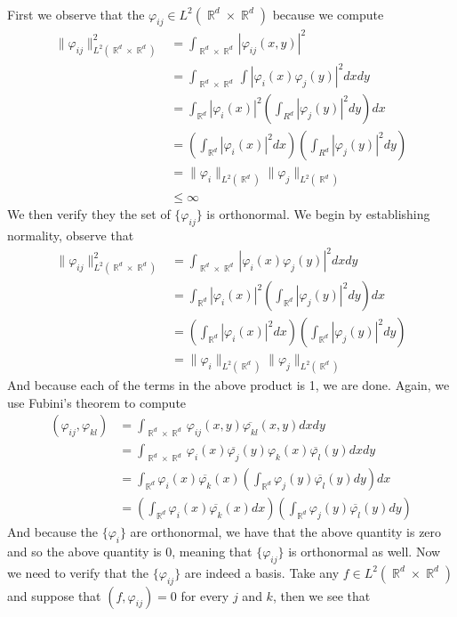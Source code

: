\documentclass{article}
\DeclareMathOperator{\R}{\mathbb{R}}
\newcommand{\problem}[1]{\noindent{\textbf{Problem #1}}\\}
\newcommand{\norm}[1]{\|#1\|}
\begin{document}
\problem{4.7.7} First we observe that the $\varphi_{ij} \in L^2(\R^d \times \R^d)$ because we compute
\begin{align*}
\norm{\varphi_{ij}}^2_{L^2(\R^d \times \R^d)} &=\int_{\R^d \times \R^d} |\varphi_{ij}(x,y)|^2 \\
&= \int_{\R^d \times \R^d}\int |\varphi_i(x)\varphi_j(y)|^2dxdy \\
&= \int_{\R^d} |\varphi_i(x)|^2\left(\int_{R^d} |\varphi_j(y)|^2dy\right)dx \\
&= \left(\int_{\R^d} |\varphi_i(x)|^2dx\right)\left(\int_{R^d} |\varphi_j(y)|^2dy\right) \\
&= \norm{\varphi_i}_{L^2(\R^d)}\norm{\varphi_{j}}_{L^2(\R^d)} \\
&\leq \infty
\end{align*}
We then verify they the set of $\{\varphi_{ij}\}$ is orthonormal. We begin by establishing normality, observe that
\begin{align*}
\norm{\varphi_{ij}}^2_{L^2(\R^d \times \R^d)} &= \int_{\R^d \times \R^d} |\varphi_i(x)\varphi_j(y)|^2dxdy\\
&= \int_{\R^d} |\varphi_i(x)|^2 \left(\int_{\R^d} |\varphi_j(y)|^2dy\right)dx \\
&= \left(\int_{\R^d}|\varphi_i(x)|^2dx \right)\left(\int_{\R^d} |\varphi_j(y)|^2dy\right) \\
&= \norm{\varphi_i}_{L^2(\R^d)}\norm{\varphi_j}_{L^2(\R^d)} 
\end{align*}
And because each of the terms in the above product is 1, we are done. Again, we use Fubini's theorem to compute
\begin{align*}
(\varphi_{ij} , \varphi_{kl}) &= \int_{\R^d \times \R^d} \varphi_{ij}(x,y)\overline{\varphi_{kl}}(x,y)dxdy \\
&= \int_{\R^d \times \R^d} \varphi_i(x)\overline{\varphi_j}(y)\varphi_k(x)\overline{\varphi_l}(y)dxdy \\
&=  \int_{\R^d} \varphi_i(x)\overline{\varphi_k}(x)\left(\int_{\R^d} \varphi_j(y)\overline{\varphi_l}(y)dy\right)dx \\
&= \left(\int_{\R^d} \varphi_i(x)\overline{\varphi_k}(x)dx\right)\left(\int_{\R^d} \varphi_j(y)\overline{\varphi_l}(y)dy\right) 
\end{align*}
And because the $\{\varphi_i\}$ are orthonormal, we have that the above quantity is zero and so the above quantity is 0, meaning that $\{\varphi_{ij}\}$ is orthonormal as well. Now we need to verify that the $\{\varphi_{ij}\}$ are indeed a basis. Take any $f \in L^{2}(\R^d \times \R^d)$ and suppose that $(f, \varphi_{ij}) = 0$ for every $j$ and $k$, then we see that
\end{document}
